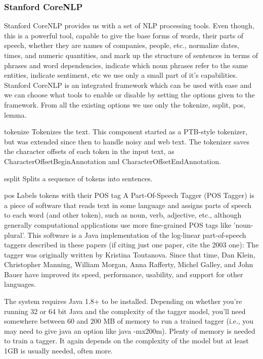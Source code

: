 \subsubsection{Stanford CoreNLP}
\label{sec:frameworks-stanford-corenlp}
Stanford CoreNLP provides us with a set of NLP processing tools. Even though, this is a powerful tool, capable to give the base forms of words, their parts of speech, whether they are names of companies, people, etc., normalize dates, times, and numeric quantities, and mark up the structure of sentences in terms of phrases and word dependencies, indicate which noun phrases refer to the same entities, indicate sentiment, etc we use only a small part of it's capabilities.
Stanford CoreNLP is an integrated framework which can be used with ease and we can choose what tools to enable or disable by setting the options given to the framework. 
From all the existing options we use only the tokenize, ssplit, pos, lemma.

tokenize
Tokenizes the text. This component started as a PTB-style tokenizer, but was extended since then to handle noisy and web text. The tokenizer saves the character offsets of each token in the input text, as CharacterOffsetBeginAnnotation and CharacterOffsetEndAnnotation.

ssplit 
Splits a sequence of tokens into sentences.

pos
Labels tokens with their POS tag
A Part-Of-Speech Tagger (POS Tagger) is a piece of software that reads text in some language and assigns parts of speech to each word (and other token), such as noun, verb, adjective, etc., although generally computational applications use more fine-grained POS tags like 'noun-plural'. This software is a Java implementation of the log-linear part-of-speech taggers described in these papers (if citing just one paper, cite the 2003 one):
The tagger was originally written by Kristina Toutanova. Since that time, Dan Klein, Christopher Manning, William Morgan, Anna Rafferty, Michel Galley, and John Bauer have improved its speed, performance, usability, and support for other 
languages.

The system requires Java 1.8+ to be installed. Depending on whether you're running 32 or 64 bit Java and the complexity of the tagger model, you'll need somewhere between 60 and 200 MB of memory to run a trained tagger (i.e., you may need to give java an option like java -mx200m). Plenty of memory is needed to train a tagger. It again depends on the complexity of the model but at least 1GB is usually needed, often more.

